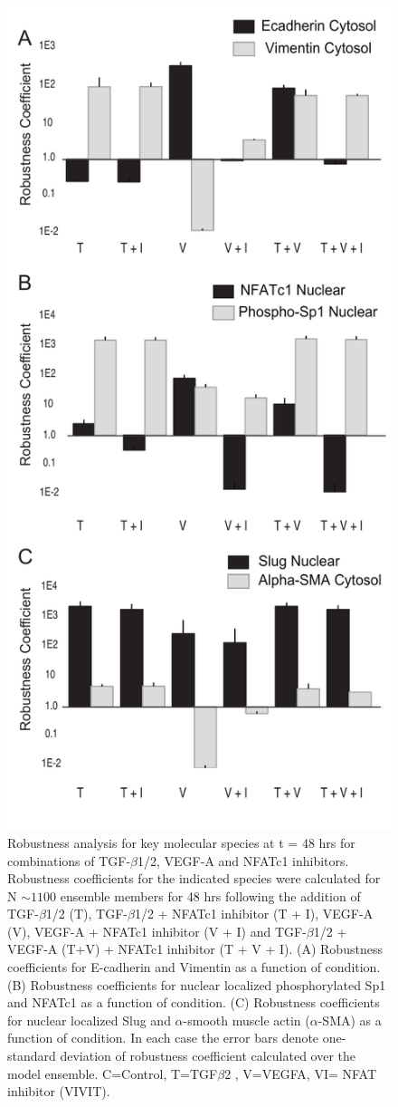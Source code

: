\documentclass[12pt]{article}
\begin{document}
\begin{figure}
\includegraphics [width=0.5\linewidth] {./figs/Fig-2-Supplemental-Robustness.pdf}
\caption{Robustness analysis for key molecular species at t = 48 hrs for combinations of TGF-$\beta$1/2, VEGF-A and NFATc1 inhibitors. Robustness coefficients for the indicated species were calculated
for N $\sim{1100}$ ensemble members for 48 hrs following the addition of TGF-$\beta$1/2 (T), TGF-$\beta$1/2 + NFATc1 inhibitor (T + I), VEGF-A (V), VEGF-A + NFATc1 inhibitor (V + I) and TGF-$\beta$1/2 + VEGF-A (T+V) + NFATc1 inhibitor (T + V + I).
(A) Robustness coefficients for E-cadherin and Vimentin as a function of condition.
(B) Robustness coefficients for nuclear localized phosphorylated Sp1 and NFATc1 as a function of condition.
(C) Robustness coefficients for nuclear localized Slug and $\alpha$-smooth muscle actin ($\alpha$-SMA) as a function of condition.
In each case the error bars denote one-standard deviation of robustness coefficient calculated over the model ensemble.
C=Control, T=TGF$\beta$2 , V=VEGFA, VI= NFAT inhibitor (VIVIT).}\label{fg:S2}
\end{figure}
\end{document}
